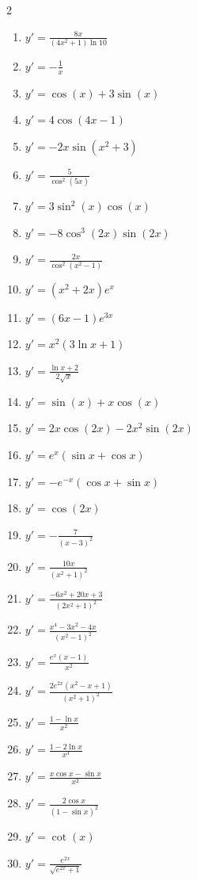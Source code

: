 \documentclass[11pt,a4paper]{article}
\begin{document}
\newpage

\begin{multicols}{2}
\begin{enumerate}[label=\textbf{\arabic*.}, leftmargin=2em, itemsep=10pt, start=31]
    \item $y' = \frac{8x}{(4x^2 + 1)\ln 10}$
    \item $y' = -\frac{1}{x}$
    \item $y' = \cos(x) + 3\sin(x)$
    \item $y' = 4\cos(4x - 1)$
    \item $y' = -2x\sin(x^2 + 3)$
    \item $y' = \frac{5}{\cos^2(5x)}$
    \item $y' = 3\sin^2(x)\cos(x)$
    \item $y' = -8\cos^3(2x)\sin(2x)$
    \item $y' = \frac{2x}{\cos^2(x^2 - 1)}$
    \item $y' = (x^2 + 2x)e^x$
    \item $y' = (6x - 1)e^{3x}$
    \item $y' = x^2(3\ln x + 1)$
    \item $y' = \frac{\ln x + 2}{2\sqrt{x}}$
    \item $y' = \sin(x) + x\cos(x)$
    \item $y' = 2x\cos(2x) - 2x^2\sin(2x)$
    \item $y' = e^x(\sin x + \cos x)$
    \item $y' = -e^{-x}(\cos x + \sin x)$
    \item $y' = \cos(2x)$
    \item $y' = -\frac{7}{(x - 3)^2}$
    \item $y' = \frac{10x}{(x^2 + 1)^2}$
    \item $y' = \frac{-6x^2 + 20x + 3}{(2x^2 + 1)^2}$
    \item $y' = \frac{x^4 - 3x^2 - 4x}{(x^2 - 1)^2}$
    \item $y' = \frac{e^x(x - 1)}{x^2}$
    \item $y' = \frac{2e^{2x}(x^2 - x + 1)}{(x^2 + 1)^2}$
    \item $y' = \frac{1 - \ln x}{x^2}$
    \item $y' = \frac{1 - 2\ln x}{x^3}$
    \item $y' = \frac{x\cos x - \sin x}{x^2}$
    \item $y' = \frac{2\cos x}{(1 - \sin x)^2}$
    \item $y' = \cot(x)$
    \item $y' = \frac{e^{2x}}{\sqrt{e^{2x} + 1}}$
\end{enumerate}
\end{multicols}
\end{document}
